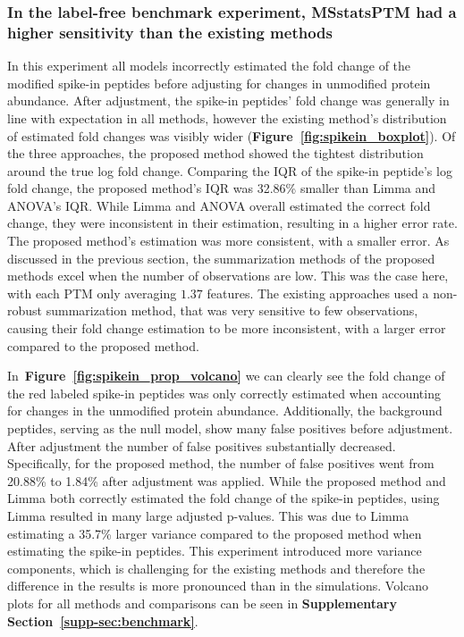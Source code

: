 \documentclass[mcp]{article}
\numberwithin{table}{section}
\def\figref#1{{\bf Figure~\ref{fig:#1}}}
\begin{document}
\subsubsection*{In the label-free benchmark experiment, MSstatsPTM had a higher sensitivity than the existing methods}

In this experiment all models incorrectly estimated the fold change of the modified spike-in peptides before adjusting for changes in unmodified protein abundance. After adjustment, the spike-in peptides' fold change was generally in line with expectation in all methods, however the existing method's distribution of estimated fold changes was visibly wider (\figref{spikein_boxplot}). Of the three approaches, the proposed method showed the tightest distribution around the true log fold change. Comparing the IQR of the spike-in peptide's log fold change, the proposed method's IQR was 32.86\% smaller than Limma and ANOVA's IQR. While Limma and ANOVA overall estimated the correct fold change, they were inconsistent in their estimation, resulting in a higher error rate. The proposed method's estimation was more consistent, with a smaller error. As discussed in the previous section, the summarization methods of the proposed methods excel when the number of observations are low. This was the case here, with each PTM only averaging $1.37$ features. The existing approaches used a non-robust summarization method, that was very sensitive to few observations, causing their fold change estimation to be more inconsistent, with a larger error compared to the proposed method.

In~\figref{spikein_prop_volcano} we can clearly see the fold change of the red labeled spike-in peptides was only correctly estimated when accounting for changes in the unmodified protein abundance. Additionally, the background peptides, serving as the null model, show many false positives before adjustment. After adjustment the number of false positives substantially decreased. Specifically, for the proposed method, the number of false positives went from 20.88\% to 1.84\% after adjustment was applied. While the proposed method and Limma both correctly estimated the fold change of the spike-in peptides, using Limma resulted in many large adjusted p-values. This was due to Limma estimating a 35.7\% larger variance compared to the proposed method when estimating the spike-in peptides. This experiment introduced more variance components, which is challenging for the existing methods and therefore the difference in the results is more pronounced than in the simulations. Volcano plots for all methods and comparisons can be seen in {\bf Supplementary Section~\ref{supp-sec:benchmark}}.
\end{document}
